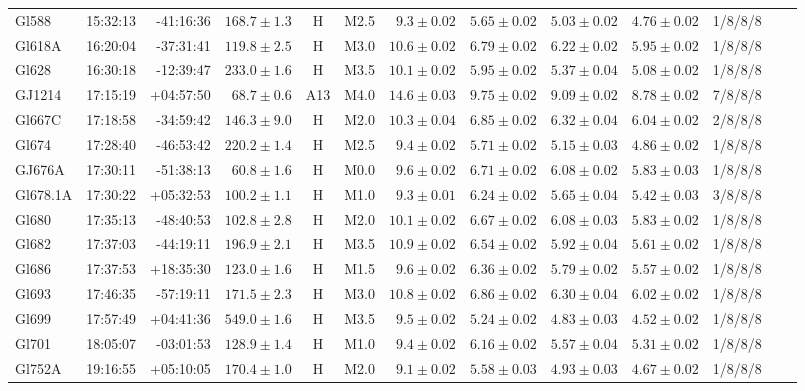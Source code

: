 \documentclass{aa}
\begin{document}
\begin{table}[h!]
{\begin{tabular}{ l r r r c c r r r r r r r}
Gl588 & 15:32:13 & -41:16:36 & $168.7 \pm  1.3$ & H & M2.5 & $ 9.3 \pm 0.02$ & $5.65 \pm 0.02$ & $5.03 \pm 0.02$ & $4.76 \pm 0.02$ & 1/8/8/8 \\
Gl618A & 16:20:04 & -37:31:41 & $119.8 \pm  2.5$ & H & M3.0 & $10.6 \pm 0.02$ & $6.79 \pm 0.02$ & $6.22 \pm 0.02$ & $5.95 \pm 0.02$ & 1/8/8/8 \\
Gl628 & 16:30:18 & -12:39:47 & $233.0 \pm  1.6$ & H & M3.5 & $10.1 \pm 0.02$ & $5.95 \pm 0.02$ & $5.37 \pm 0.04$ & $5.08 \pm 0.02$ & 1/8/8/8 \\
GJ1214 & 17:15:19 & +04:57:50 & $68.7 \pm  0.6$ & A13 & M4.0 & $14.6 \pm 0.03$ & $9.75 \pm 0.02$ & $9.09 \pm 0.02$ & $8.78 \pm 0.02$ & 7/8/8/8 \\
Gl667C & 17:18:58 & -34:59:42 & $146.3 \pm  9.0$ & H & M2.0 & $10.3 \pm 0.04$ & $6.85 \pm 0.02$ & $6.32 \pm 0.04$ & $6.04 \pm 0.02$ & 2/8/8/8 \\
Gl674 & 17:28:40 & -46:53:42 & $220.2 \pm  1.4$ & H & M2.5 & $ 9.4 \pm 0.02$ & $5.71 \pm 0.02$ & $5.15 \pm 0.03$ & $4.86 \pm 0.02$ & 1/8/8/8 \\
GJ676A & 17:30:11 & -51:38:13 & $60.8 \pm  1.6$ & H & M0.0 & $ 9.6 \pm 0.02$ & $6.71 \pm 0.02$ & $6.08 \pm 0.02$ & $5.83 \pm 0.03$ & 1/8/8/8 \\
Gl678.1A & 17:30:22 & +05:32:53 & $100.2 \pm  1.1$ & H & M1.0 & $ 9.3 \pm 0.01$ & $6.24 \pm 0.02$ & $5.65 \pm 0.04$ & $5.42 \pm 0.03$ & 3/8/8/8 \\
Gl680 & 17:35:13 & -48:40:53 & $102.8 \pm  2.8$ & H & M2.0 & $10.1 \pm 0.02$ & $6.67 \pm 0.02$ & $6.08 \pm 0.03$ & $5.83 \pm 0.02$ & 1/8/8/8 \\
Gl682 & 17:37:03 & -44:19:11 & $196.9 \pm  2.1$ & H & M3.5 & $10.9 \pm 0.02$ & $6.54 \pm 0.02$ & $5.92 \pm 0.04$ & $5.61 \pm 0.02$ & 1/8/8/8 \\
Gl686 & 17:37:53 & +18:35:30 & $123.0 \pm  1.6$ & H & M1.5 & $ 9.6 \pm 0.02$ & $6.36 \pm 0.02$ & $5.79 \pm 0.02$ & $5.57 \pm 0.02$ & 1/8/8/8 \\
Gl693 & 17:46:35 & -57:19:11 & $171.5 \pm  2.3$ & H & M3.0 & $10.8 \pm 0.02$ & $6.86 \pm 0.02$ & $6.30 \pm 0.04$ & $6.02 \pm 0.02$ & 1/8/8/8 \\
Gl699 & 17:57:49 & +04:41:36 & $549.0 \pm  1.6$ & H & M3.5 & $ 9.5 \pm 0.02$ & $5.24 \pm 0.02$ & $4.83 \pm 0.03$ & $4.52 \pm 0.02$ & 1/8/8/8 \\
Gl701 & 18:05:07 & -03:01:53 & $128.9 \pm  1.4$ & H & M1.0 & $ 9.4 \pm 0.02$ & $6.16 \pm 0.02$ & $5.57 \pm 0.04$ & $5.31 \pm 0.02$ & 1/8/8/8 \\
Gl752A & 19:16:55 & +05:10:05 & $170.4 \pm  1.0$ & H & M2.0 & $ 9.1 \pm 0.02$ & $5.58 \pm 0.03$ & $4.93 \pm 0.03$ & $4.67 \pm 0.02$ & 1/8/8/8 \\

\end{tabular}}
\end{table}
\end{document}
